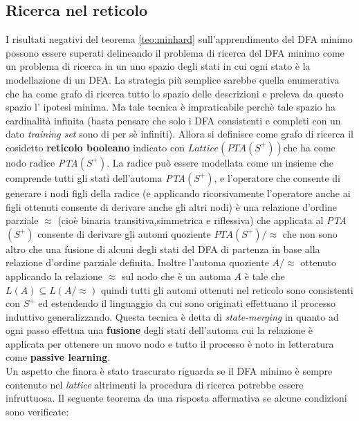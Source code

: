 \subsection{Ricerca nel reticolo}
\label{sub:ricret}
I risultati negativi del teorema \ref{teo:minhard} sull'apprendimento del \ac{DFA} minimo possono essere superati delineando il problema di ricerca del  \ac{DFA} minimo come un problema di ricerca in un uno spazio degli stati in cui ogni stato è la modellazione di un \ac{DFA}. La strategia più semplice sarebbe quella enumerativa che ha come grafo di ricerca tutto lo spazio delle descrizioni e preleva da questo spazio l' ipotesi minima. Ma tale tecnica è impraticabile perchè tale spazio ha cardinalità infinita (basta pensare che solo i \ac{DFA} consistenti e completi con un dato \textit{training set} sono di per sè infiniti). Allora si definisce come grafo di ricerca il cosidetto \textbf{reticolo booleano} indicato con \textbf{$Lattice(PTA(S^+))$}che ha come nodo radice \textit{PTA$(S^+)$}. La radice può essere modellata come un insieme che comprende tutti gli stati dell'automa \textit{PTA$(S^+)$}, e l'operatore che consente di generare i nodi figli della radice (e  applicando ricorsivamente l'operatore anche ai figli ottenuti consente di derivare anche gli altri nodi) è una relazione d'ordine parziale  $\approx$ (cioè binaria transitiva,simmetrica e riflessiva) che applicata al \textit{PTA$(S^+)$} consente di derivare gli automi quoziente $PTA(S^+)/\!\!\approx$ che non sono altro che una fusione di alcuni degli stati del \ac{DFA} di partenza in base alla relazione d'ordine parziale definita. Inoltre l'automa quoziente $A/\!\!\approx$ ottenuto applicando la relazione $\approx$ sul nodo che è un automa $A$ è tale che $L(A) \subseteq L(A/\!\!\approx)$ quindi tutti gli automi ottenuti nel reticolo sono consistenti con $S^{+}$ ed estendendo il linguaggio da cui sono originati effettuano il processo induttivo generalizzando. Questa tecnica è detta di \textit{state-merging} in quanto ad ogni passo effettua una \textbf{fusione} degli stati dell'automa cui la relazione è applicata per ottenere un nuovo nodo e tutto il processo è noto in letteratura come \textbf{passive learning}.\\
Un aspetto che finora è stato trascurato riguarda se il \ac{DFA} minimo è sempre contenuto nel \textit{lattice}  altrimenti la procedura di ricerca potrebbe essere infruttuosa. Il seguente teorema \cite{Pao78} da una risposta affermativa se alcune condizioni sono verificate:

